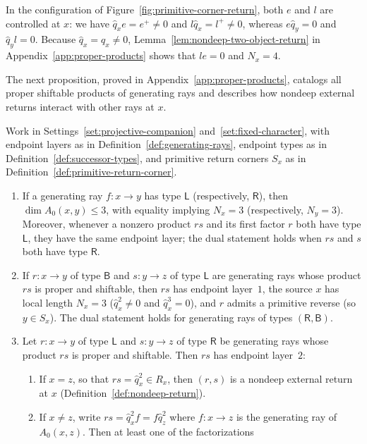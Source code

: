 In the configuration of Figure~\ref{fig:primitive-corner-return}, both $e$ and $l$ are controlled at $x$: we have $\widehat q_xe=e^+\ne0$ and $l\widehat q_x=l^+\ne0$, whereas $e\widehat q_y=0$ and $\widehat q_yl=0$. Because $\widehat q_x=q_x\ne0$, Lemma~\ref{lem:nondeep-two-object-return} in Appendix~\ref{app:proper-products} shows that $le=0$ and $N_x=4$.

The next proposition, proved in Appendix~\ref{app:proper-products}, catalogs all proper shiftable products of generating rays and describes how nondeep external returns interact with other rays at $x$.

\begin{proposition}
\label{prop:proper-ray-products}
Work in Settings~\ref{set:projective-companion} and~\ref{set:fixed-character}, with endpoint layers as in Definition~\ref{def:generating-rays}, endpoint types as in Definition~\ref{def:successor-types}, and primitive return corners $S_x$ as in Definition~\ref{def:primitive-return-corner}.
\begin{enumerate}[label={\upshape(\arabic*)}]
\item If a generating ray $f\colon x\to y$ has type $\mathsf L$ (respectively, $\mathsf R$), then $\dim A_0(x,y)\leq3$, with equality implying $N_x=3$ (respectively, $N_y=3$). Moreover, whenever a nonzero product $rs$ and its first factor $r$ both have type $\mathsf L$, they have the same endpoint layer; the dual statement holds when $rs$ and $s$ both have type $\mathsf R$.
\item If $r\colon x\to y$ of type $\mathsf B$ and $s\colon y\to z$ of type $\mathsf L$ are generating rays whose product $rs$ is proper and shiftable, then $rs$ has endpoint layer~$1$, the source $x$ has local length $N_x=3$ ($\widehat q_x^2\ne0$ and $\widehat q_x^3=0$), and $r$ admits a primitive reverse (so $y\in S_x$). The dual statement holds for generating rays of types $(\mathsf R,\mathsf B)$.
\item Let $r\colon x\to y$ of type $\mathsf L$ and $s\colon y\to z$ of type $\mathsf R$ be generating rays whose product $rs$ is proper and shiftable. Then $rs$ has endpoint layer~$2$:
\begin{enumerate}[label={\upshape(\alph*)}]
\item If $x=z$, so that $rs=\widehat q_x^2\in R_x$, then $(r,s)$ is a nondeep external return at $x$ (Definition~\ref{def:nondeep-return}).
\item If $x\ne z$, write $rs=\widehat q_x^2f=f\widehat q_z^2$ where $f\colon x\to z$ is the generating ray of $A_0(x,z)$. Then at least one of the factorizations

\end{enumerate}
\end{enumerate}
\end{proposition}
